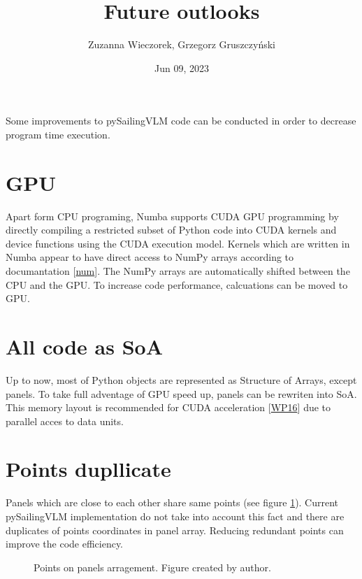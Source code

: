 \documentclass[a4paper,12pt,english]{jupyterBook}
\title{Future outlooks}
\date{Jun 09, 2023}
\author{Zuzanna Wieczorek, Grzegorz Gruszczyński}
\let\sphinxpxdimen\pdfpxdimen\else\newdimen\sphinxpxdimen
\begin{document}
\pagestyle{empty}
\sphinxmaketitle
\clearpage

\pagestyle{plain}
\sphinxtableofcontents
\pagestyle{normal}
\label{\detokenize{chapters/future::doc}}


\sphinxAtStartPar
Some improvements to pySailingVLM code can be conducted in order to decrease program time execution.


\part{GPU}
\label{\detokenize{chapters/future:gpu}}
\sphinxAtStartPar
Apart form CPU programing, Numba supports CUDA GPU programming by directly compiling a restricted subset of Python code into CUDA kernels and device functions using the CUDA execution model. Kernels which are written in Numba appear to have direct access to NumPy arrays according to documantation {[}\hyperlink{cite.chapters/bibliography:id14}{num}{]}. The NumPy arrays are automatically shifted between the CPU and the GPU. To increase code performance, calcuations can be moved to GPU.


\part{All code as SoA}
\label{\detokenize{chapters/future:all-code-as-soa}}
\sphinxAtStartPar
Up to now, most of Python objects are represented as Structure of Arrays, except panels. To take full adventage of GPU speed up, panels can be rewriten into SoA. This memory layout is recommended for CUDA acceleration {[}\hyperlink{cite.chapters/bibliography:id13}{WP16}{]} due to parallel acces to data units.


\part{Points dupllicate}
\label{\detokenize{chapters/future:points-dupllicate}}
\sphinxAtStartPar
Panels which are close to each other share same points (see figure \hyperref[\detokenize{chapters/future:future-panels}]{\ref{\detokenize{chapters/future:future-panels}}}). Current pySailingVLM implementation do not take into account this fact and there are duplicates of points coordinates in panel array. Reducing redundant points can improve the code efficiency.

\begin{figure}[htbp]
\centering
\capstart

\noindent\sphinxincludegraphics[height=500\sphinxpxdimen]{{future_drawio}.png}
\caption{Points on panels arragement. Figure created by author.}\label{\detokenize{chapters/future:future-panels}}\end{figure}







\renewcommand{\indexname}{Index}
\printindex
\end{document}
